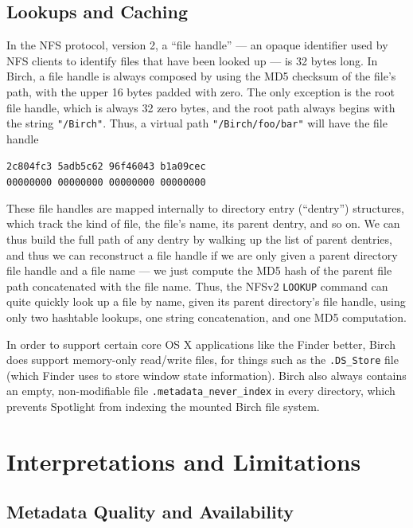 \documentclass{article}
\begin{document}
\subsection{Lookups and Caching}

In the NFS protocol, version 2, a ``file handle'' --- an opaque
identifier used by NFS clients to identify files that have been looked
up --- is 32 bytes long. In Birch, a file handle is always composed by
using the MD5 \cite{RFC1321} checksum of the file's path, with the
upper 16 bytes padded with zero. The only exception is the root file
handle, which is always 32 zero bytes, and the root path always begins
with the string \texttt{"/Birch"}. Thus, a virtual path
\texttt{"/Birch/foo/bar"} will have the file handle

\begin{center}
  \texttt{2c804fc3 5adb5c62 96f46043 b1a09cec} \\
  \texttt{00000000 00000000 00000000 00000000}
\end{center}

\noindent These file handles are mapped internally to directory entry
(``dentry'') structures, which track the kind of file, the file's
name, its parent dentry, and so on. We can thus build the full path of
any dentry by walking up the list of parent dentries, and thus we can
reconstruct a file handle if we are only given a parent directory file
handle and a file name --- we just compute the MD5 hash of the parent
file path concatenated with the file name. Thus, the NFSv2
\texttt{LOOKUP} command can quite quickly look up a file by name,
given its parent directory's file handle, using only two hashtable
lookups, one string concatenation, and one MD5 computation.

In order to support certain core OS X applications like the Finder
better, Birch does support memory-only read/write files, for things
such as the \texttt{.DS\_Store} file (which Finder uses to store
window state information). Birch also always contains an empty,
non-modifiable file \texttt{.metadata\_never\_index} in every
directory, which prevents Spotlight from indexing the mounted Birch
file system.

\section{Interpretations and Limitations}

\subsection{Metadata Quality and Availability}
\end{document}
